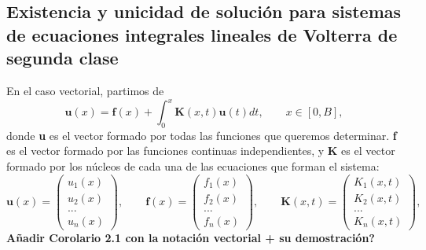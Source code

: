 \subsection{Existencia y unicidad de solución para sistemas de ecuaciones integrales lineales de Volterra de segunda clase}
En el caso vectorial, partimos de
\begin{equation}
	\textbf{u}(x) = \textbf{f}(x) + \int_0^x \textbf{K}(x,t)\textbf{u}(t)dt, \qquad x \in [0,B],
\end{equation}
donde \textbf{u} es el vector formado por todas las funciones que queremos determinar. \textbf{f} es el vector formado por las funciones continuas independientes, y \textbf{K} es el vector formado por los núcleos de cada una de las ecuaciones que forman el sistema:
\begin{equation}
	\textbf{u}(x) = \begin{pmatrix}	u_1(x) \\ u_2(x) \\ ... \\ u_n(x)	\end{pmatrix}, \qquad \textbf{f}(x) = \begin{pmatrix}	f_1(x) \\ f_2(x) \\ ... \\ f_n(x)	\end{pmatrix}, \qquad \textbf{K}(x,t) = \begin{pmatrix}	K_1(x,t) \\ K_2(x,t) \\ ... \\ K_n(x,t)	\end{pmatrix},
\end{equation}
\textbf{Añadir Corolario 2.1 con la notación vectorial + su demostración?}

\endinput
